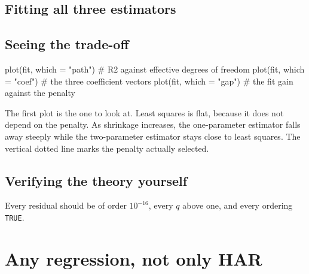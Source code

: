 \documentclass[11pt,a4paper]{report}
\begin{document}
\section{Fitting all three estimators}


\section{Seeing the trade-off}

\begin{Rblock}
plot(fit, which = "path")   # R2 against effective degrees of freedom
plot(fit, which = "coef")   # the three coefficient vectors
plot(fit, which = "gap")    # the fit gain against the penalty
\end{Rblock}

The first plot is the one to look at. Least squares is flat, because it
does not depend on the penalty. As shrinkage increases, the
one-parameter estimator falls away steeply while the two-parameter
estimator stays close to least squares. The vertical dotted line marks
the penalty actually selected.

\section{Verifying the theory yourself}


Every residual should be of order $10^{-16}$, every $q$ above one, and
every ordering \texttt{TRUE}.

\chapter{Any regression, not only HAR}
\end{document}
